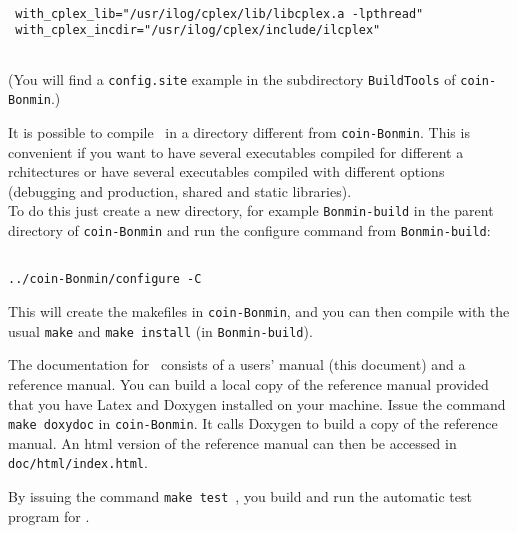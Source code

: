 \begin{colorverb}
 \begin{verbatim}

 with_cplex_lib="/usr/ilog/cplex/lib/libcplex.a -lpthread"
 with_cplex_incdir="/usr/ilog/cplex/include/ilcplex"
 
 \end{verbatim}
\end{colorverb}

 (You will find a {\tt config.site} example in the subdirectory {\tt BuildTools} of {\tt coin-Bonmin}.)

It is possible to compile \Bonmin\ in a directory different from {\tt coin-Bonmin}.
This is convenient if you want to have several executables compiled for different a
rchitectures or have several executables compiled with different options
(debugging and production, shared and static libraries).\\

To do this just create a new directory, for example {\tt Bonmin-build} in the parent directory of
{\tt coin-Bonmin} and run the configure command from {\tt Bonmin-build}:


\begin{colorverb}
\begin{verbatim}

../coin-Bonmin/configure -C

\end{verbatim}
\end{colorverb}

This will create the makefiles in {\tt coin-Bonmin}, and
you can then compile with the usual {\tt make} and {\tt make install}
(in {\tt Bonmin-build}).

The documentation for \Bonmin\ consists of a users' manual (this document) and a reference manual.
You can build a local copy of the reference manual provided that you have Latex
and Doxygen installed on your machine. Issue the command {\tt make
doxydoc} in {\tt coin-Bonmin}. It calls Doxygen to build a copy of the
reference manual. An html version of the reference manual can then
be accessed in {\tt doc/html/index.html}.


By issuing the command {\tt make test}~, you build and run the automatic test program for \Bonmin.
